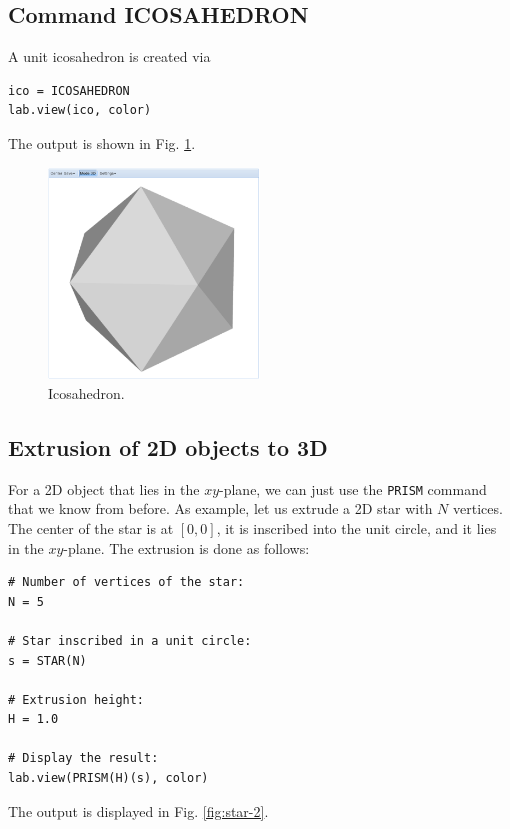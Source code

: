 \documentclass[article,A4,12pt]{llncs}
\begin{document}
\subsection{Command ICOSAHEDRON}

A unit icosahedron is created via

\begin{verbatim}
ico = ICOSAHEDRON
lab.view(ico, color)
\end{verbatim}
The output is shown in Fig. \ref{fig:icosa}.

\newpage

\begin{figure}[!ht]
\begin{center}
\includegraphics[width=0.5\textwidth]{img/icosa.png}
\end{center}
\vspace{-2mm}
\caption{Icosahedron.}
\label{fig:icosa}
\end{figure}




\subsection{Extrusion of 2D objects to 3D}

For a 2D object that lies in the $xy$-plane, we can just 
use the {\tt PRISM} command that we know from before. As example, let us 
extrude a 2D star with $N$ vertices. The center of the star is at $[0, 0]$, 
it is inscribed into the unit circle, and it lies in the $xy$-plane. 
The extrusion is done as follows:

\begin{verbatim}
# Number of vertices of the star:
N = 5

# Star inscribed in a unit circle:
s = STAR(N)

# Extrusion height:
H = 1.0

# Display the result:
lab.view(PRISM(H)(s), color)
\end{verbatim}
The output is displayed in Fig. \ref{fig:star-2}.
\end{document}
